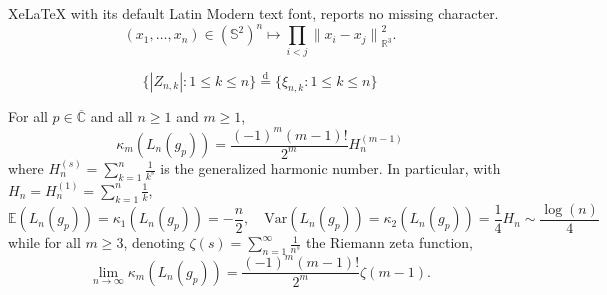 \documentclass[10pt,a4paper]{amsart}
\begin{document}
XeLaTeX with its default Latin Modern text font, reports no missing character.
\begin{equation}\label{eq:gas:S}
  (x_1,\ldots,x_n)\in(\mathbb{S}^2)^n
  \mapsto\prod_{i<j}{\|x_i-x_j\|}_{\mathbb{R}^3}^2.
\end{equation}

\begin{equation}\label{eq:kostlan2}
  \{|Z_{n,k}|:1\leq k\leq n\}\overset{\mathrm{d}}{=}\{\xi_{n,k}:1\leq k\leq
  n\}
\end{equation}

\begin{lemma}[Cumulants of $L_n(g_p)$]\label{le:Green:cum}
  For all $p\in\overline{\mathbb{C}}$ and all $n\geq1$ and $m\geq1$,
  \begin{equation}\label{eq:Lngp:cum}
    \kappa_m(L_n(g_p)) = \frac{(-1)^m (m-1)!}{2^m}H_{n}^{(m-1)}    
  \end{equation}
  where $H^{(s)}_n=\sum_{k=1}^n\frac{1}{k^s}$ is the generalized harmonic number. In particular, with $H_n=H_n^{(1)}=\sum_{k=1}^n\frac{1}{k}$,
  \begin{equation}\label{eq:Green:mean:var}
    \mathbb{E}(L_n(g_p))=\kappa_1(L_n(g_p))=-\frac{n}{2},
    \quad \mathrm{Var}(L_n(g_p))=\kappa_2(L_n(g_p))=\frac{1}{4}H_n\sim\frac{\log(n)}{4}
   \end{equation}
   while for all $m\geq3$, denoting $\zeta(s)=\sum_{n=1}^\infty\frac{1}{n^s}$ the Riemann zeta function,
   \begin{equation}
    \lim_{n\to\infty}\kappa_m(L_n(g_p)) = \frac{(-1)^m (m-1)!}{2^m}\zeta(m-1).
  \end{equation}
\end{lemma}
\end{document}
